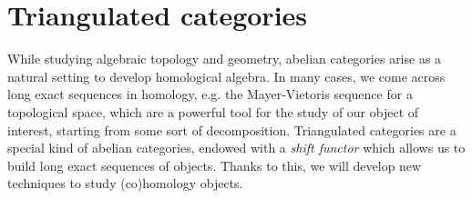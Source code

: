 \documentclass[a4paper, 10pt, oneside, DIV=9, chapterprefix=true, numbers=enddot,bibliography=totoc]{scrbook}
\begin{document}
%
%
%
%
%    
%    
%    
%    





\chapter{Triangulated categories}

While studying algebraic topology and geometry,
abelian categories arise as a natural
setting to develop homological algebra.
In many cases, we come across long exact sequences 
in homology, e.g. the Mayer-Vietoris sequence for
a topological space, which are a powerful tool
for the study of our object of interest,
starting from some sort of decomposition.
Triangulated categories are a special kind of
abelian categories, endowed with a \emph{shift functor}
which allows us to build long exact sequences of objects.
Thanks to this, we will develop
new techniques to study (co)homology objects.

    
    
    
    
    
    
    
\end{document}
